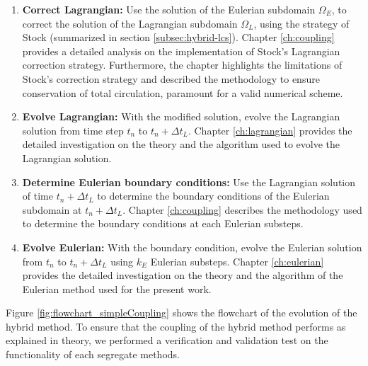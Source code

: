 		\begin{enumerate}
		\item \textbf{Correct Lagrangian:} Use the solution of the Eulerian subdomain $\Omega_E$, to correct the solution of the Lagrangian subdomain $\Omega_L$, using the strategy of Stock (summarized in section 	\ref{subsec:hybrid-lcs}). Chapter \ref{ch:coupling} provides a detailed analysis on the implementation of Stock's Lagrangian correction strategy. Furthermore, the chapter highlights the limitations of Stock's correction strategy and described the methodology to ensure conservation of total circulation, paramount for a valid numerical scheme.
		
		\item \textbf{Evolve Lagrangian:} With the modified solution, evolve the Lagrangian solution from time step $t_n$ to $t_{n}+\Delta t_L$. Chapter \ref{ch:lagrangian} provides the detailed investigation on the theory and the algorithm used to evolve the Lagrangian solution.
		
		\item \textbf{Determine Eulerian boundary conditions:} Use the Lagrangian solution of time $t_{n}+\Delta t_L$ to determine the boundary conditions of the Eulerian subdomain at $t_{n}+\Delta t_L$. Chapter \ref{ch:coupling} describes the methodology used to determine the boundary conditions at each Eulerian substeps.
		
		\item \textbf{Evolve Eulerian:} With the boundary condition, evolve the Eulerian solution from $t_n$ to $t_{n}+\Delta t_L$ using $k_E$ Eulerian substeps. Chapter \ref{ch:eulerian} provides the detailed investigation on the theory and the algorithm of the Eulerian method used for the present work.
		\end{enumerate}
	
	Figure \ref{fig:flowchart_simpleCoupling} shows the flowchart of the evolution of the hybrid method. To ensure that the coupling of the hybrid method performs as explained in theory, we performed a verification and validation test on the functionality of each segregate methods.
	


	
	
